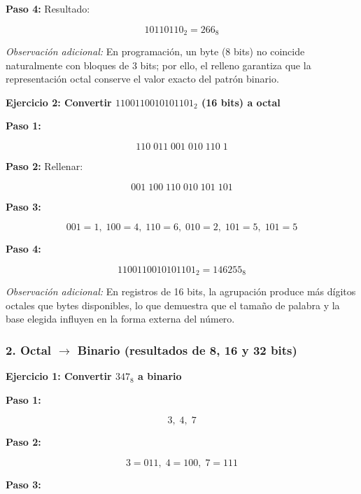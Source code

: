 \documentclass[12pt,twoside]{book}
\begin{document}
						\noindent
						\textbf{Paso 4:} Resultado:
						
						\[
						10110110_2 = 266_8
						\]
						
						\noindent
						\emph{Observación adicional:} En programación, un byte (8 bits) no coincide naturalmente con bloques de 3 bits; por ello, el relleno garantiza que la representación octal conserve el valor exacto del patrón binario.
						
						\bigskip
						
						\noindent
						\textbf{Ejercicio 2: Convertir $1100110010101101_2$ (16 bits) a octal}
						
						\noindent
						\textbf{Paso 1:}
						
						\[
						110\;011\;001\;010\;110\;1
						\]
						
						\noindent
						\textbf{Paso 2:} Rellenar:
						
						\[
						001\;100\;110\;010\;101\;101
						\]
						
						\noindent
						\textbf{Paso 3:}
						
						\[
						001=1,\;100=4,\;110=6,\;010=2,\;101=5,\;101=5
						\]
						
						\noindent
						\textbf{Paso 4:}
						
						\[
						1100110010101101_2 = 146255_8
						\]
						
						\noindent
						\emph{Observación adicional:} En registros de 16 bits, la agrupación produce más dígitos octales que bytes disponibles, lo que demuestra que el tamaño de palabra y la base elegida influyen en la forma externa del número.
						
						\subsubsection*{2. Octal $\rightarrow$ Binario (resultados de 8, 16 y 32 bits)}
						
						\noindent
						\textbf{Ejercicio 1: Convertir $347_8$ a binario}
						
						\noindent
						\textbf{Paso 1:}
						
						\[
						3,\;4,\;7
						\]
						
						\noindent
						\textbf{Paso 2:}
						
						\[
						3=011,\;4=100,\;7=111
						\]
						
						\noindent
						\textbf{Paso 3:}
						
\end{document}
